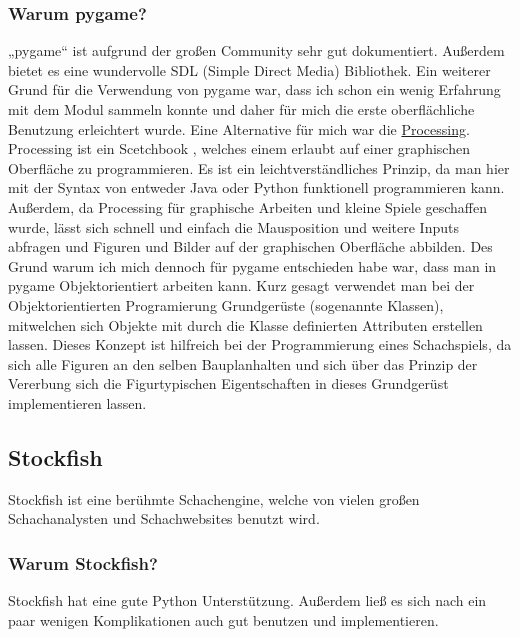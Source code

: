 \documentclass[a4paper, 10pt]{scrartcl}
\begin{document}
\subsubsection{Warum pygame?}
„pygame“ ist aufgrund der großen Community sehr gut dokumentiert.
Außerdem bietet es eine wundervolle SDL (Simple Direct Media) Bibliothek.
Ein weiterer Grund für die Verwendung von pygame war, dass ich schon ein
wenig Erfahrung mit dem Modul sammeln konnte und daher für mich die erste
oberflächliche Benutzung erleichtert wurde.
Eine Alternative für mich war die \href{https://processing.org/}{Processing}.
Processing ist ein \glqq Scetchbook \grqq , welches einem erlaubt
auf einer graphischen Oberfläche zu programmieren. Es ist ein leichtverständliches
Prinzip, da man hier mit der Syntax von entweder Java oder Python funktionell programmieren
kann. Außerdem, da Processing für graphische Arbeiten und kleine Spiele geschaffen wurde,
lässt sich schnell und einfach die Mausposition und weitere Inputs abfragen und
Figuren und Bilder auf der graphischen Oberfläche abbilden.
Des Grund warum ich mich dennoch für pygame entschieden habe war, dass man in pygame
Objektorientiert arbeiten kann. Kurz gesagt verwendet man bei der Objektorientierten Programierung
Grundgerüste (sogenannte Klassen), mitwelchen sich Objekte mit durch die Klasse definierten Attributen
erstellen lassen. Dieses Konzept ist hilfreich bei der Programmierung eines Schachspiels,
da sich alle Figuren an den selben \glqq Bauplan\grqq halten und sich über das Prinzip der Vererbung
sich die Figurtypischen Eigentschaften in dieses Grundgerüst implementieren lassen.

\subsection{Stockfish}
Stockfish ist eine berühmte Schachengine, welche von vielen großen Schachanalysten und Schachwebsites benutzt wird.

\subsubsection{Warum Stockfish?}
Stockfish hat eine gute Python Unterstützung. Außerdem ließ es sich nach ein paar wenigen Komplikationen auch gut benutzen und implementieren.
\end{document}
